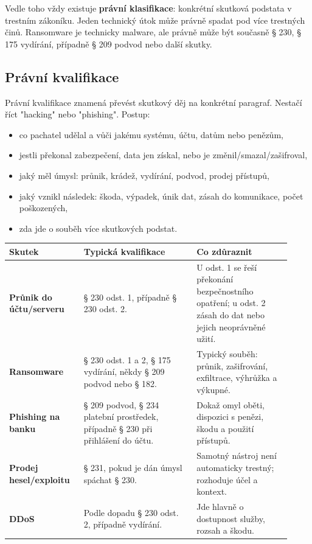 Vedle toho vždy existuje \textbf{právní klasifikace}: konkrétní skutková podstata v trestním zákoníku. Jeden technický útok může právně spadat pod více trestných činů. Ransomware je technicky malware, ale právně může být současně § 230, § 175 vydírání, případně § 209 podvod nebo další skutky.

\subsection*{Právní kvalifikace}
Právní kvalifikace znamená převést skutkový děj na konkrétní paragraf. Nestačí říct "hacking" nebo "phishing". Postup:
\begin{itemize}
  \item co pachatel udělal a vůči jakému systému, účtu, datům nebo penězům,
  \item jestli překonal zabezpečení, data jen získal, nebo je změnil/smazal/zašifroval,
  \item jaký měl úmysl: průnik, krádež, vydírání, podvod, prodej přístupů,
  \item jaký vznikl následek: škoda, výpadek, únik dat, zásah do komunikace, počet poškozených,
  \item zda jde o souběh více skutkových podstat.
\end{itemize}

\begin{longtable}{p{0.24\linewidth}p{0.37\linewidth}p{0.31\linewidth}}
\toprule
\textbf{Skutek} & \textbf{Typická kvalifikace} & \textbf{Co zdůraznit}\\
\midrule
\textbf{Průnik do účtu/serveru} & § 230 odst. 1, případně § 230 odst. 2. & U odst. 1 se řeší překonání bezpečnostního opatření; u odst. 2 zásah do dat nebo jejich neoprávněné užití.\\
\addlinespace
\textbf{Ransomware} & § 230 odst. 1 a 2, § 175 vydírání, někdy § 209 podvod nebo § 182. & Typický souběh: průnik, zašifrování, exfiltrace, výhrůžka a výkupné.\\
\addlinespace
\textbf{Phishing na banku} & § 209 podvod, § 234 platební prostředek, případně § 230 při přihlášení do účtu. & Dokaž omyl oběti, dispozici s penězi, škodu a použití přístupů.\\
\addlinespace
\textbf{Prodej hesel/exploitu} & § 231, pokud je dán úmysl spáchat § 230. & Samotný nástroj není automaticky trestný; rozhoduje účel a kontext.\\
\addlinespace
\textbf{DDoS} & Podle dopadu § 230 odst. 2, případně vydírání. & Jde hlavně o dostupnost služby, rozsah a škodu.\\
\bottomrule
\end{longtable}

